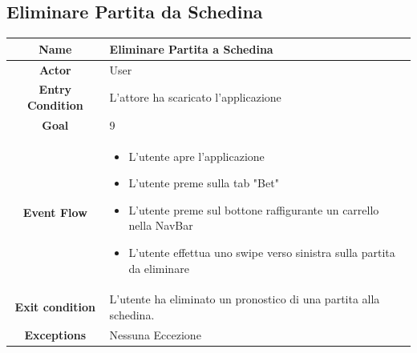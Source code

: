 \documentclass[numbers=noenddot, 12pt, a4paper, oneside]{scrbook}
\begin{document}
\subsection*{Eliminare Partita da Schedina}
\begin{tabular}{|c|p{}|}
	\hline
	\parbox[c][6ex]{6ex}{\centering \textbf{Name}} & Eliminare Partita a Schedina\\
	\hline
	\parbox[c][6ex]{6ex}{\centering \textbf{Actor}} & User \\
	\hline
	\parbox[c][10ex]{15ex}{\centering \textbf{Entry Condition}} & L'attore ha scaricato l'applicazione\\
	\hline
	\parbox[c][6ex]{15ex}{\centering \textbf{Goal}} &  9\\
	\hline
	\parbox[c][10ex]{12ex}{\centering \textbf{Event Flow}} & \begin{itemize}
		\item L'utente apre l'applicazione
		\item L'utente preme sulla tab "Bet"
		\item L'utente preme sul bottone raffigurante un carrello nella NavBar
		\item L'utente effettua uno swipe verso sinistra sulla partita da eliminare
	\end{itemize}\\
	\hline
	\parbox[c][7ex]{12ex}{\centering \textbf{Exit condition}} & L'utente ha eliminato un pronostico di una partita alla schedina.\\\hline
	\parbox[c][10ex]{13ex}{\centering \textbf{Exceptions}} & Nessuna Eccezione\\ \hline	
\end{tabular}
\end{document}
